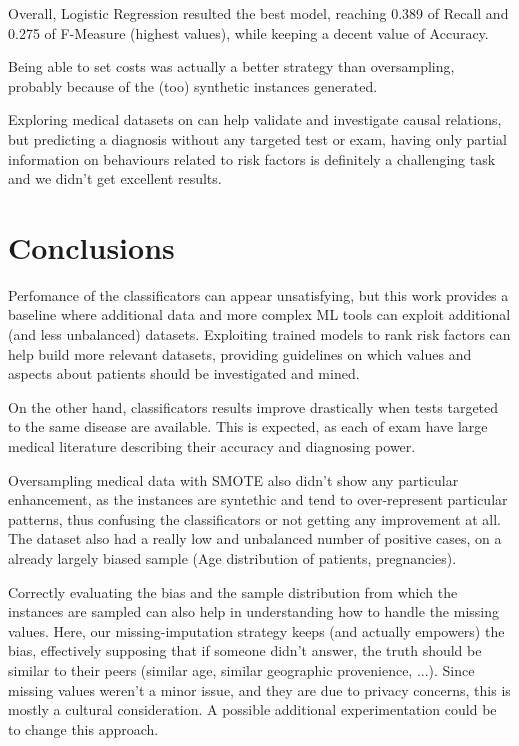 Overall, Logistic Regression resulted the best model, reaching 0.389 of Recall and 0.275 of F-Measure (highest values), while keeping a decent value of Accuracy.

Being able to set costs was actually a better strategy than oversampling, probably because of the (too) synthetic instances generated.

Exploring medical datasets on can help validate and investigate causal relations, but predicting a diagnosis without any targeted test or exam, having only partial information on behaviours related to risk factors is definitely a challenging task and we didn't get excellent results.

\section{Conclusions}

Perfomance of the classificators can appear unsatisfying, but this work provides a baseline where additional data and more complex ML tools can exploit additional (and less unbalanced) datasets. Exploiting trained models to rank risk factors can help build more relevant datasets, providing guidelines on which values and aspects about patients should be investigated and mined.

On the other hand, classificators results improve drastically when tests targeted to the same disease are available. This is expected, as each of exam have large medical literature describing their accuracy and diagnosing power.

Oversampling medical data with SMOTE also didn't show any particular enhancement, as the instances are syntethic and tend to over-represent particular patterns, thus confusing the classificators or not getting any improvement at all. The dataset also had a really low and unbalanced number of positive cases, on a already largely biased sample (Age distribution of patients, pregnancies).

Correctly evaluating the bias and the sample distribution from which the instances are sampled can also help in understanding how to handle the missing values. Here, our missing-imputation strategy keeps (and actually empowers) the bias, effectively supposing that if someone didn't answer, the truth should be similar to their peers (similar age, similar geographic provenience, ...). Since missing values weren't a minor issue, and they are due to privacy concerns, this is mostly a cultural consideration. A possible additional experimentation could be to change this approach.

